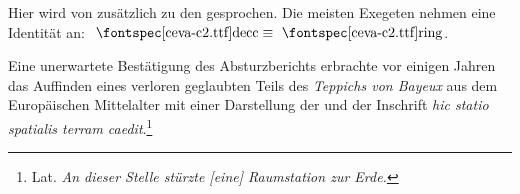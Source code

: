 Hier wird von  zusätzlich zu den  gesprochen. Die meisten Exe\-ge\-ten nehmen eine Identität an: $\text{\ceva{decc}} \equiv \text{\ceva{ring}}$.

Eine unerwartete Bestätigung des Absturzberichts erbrachte vor einigen Jahren das Auffinden eines verloren geglaubten Teils des \emph{Teppichs von Bayeux} aus dem Europäischen Mittelalter mit einer Darstellung der  und der Inschrift \emph{hic statio spatialis terram caedit}.\footnote{Lat. \emph{An dieser Stelle stürzte [eine] Raumstation zur Erde.}}

